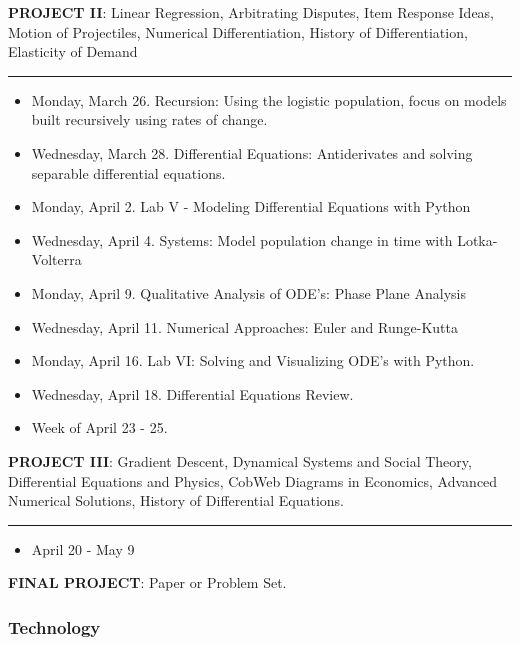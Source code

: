 \documentclass[11pt]{article}
\providecommand{\tightlist}{%
      \setlength{\itemsep}{0pt}\setlength{\parskip}{0pt}}
\begin{document}
\textbf{PROJECT II}: Linear Regression, Arbitrating Disputes, Item
Response Ideas, Motion of Projectiles, Numerical Differentiation,
History of Differentiation, Elasticity of Demand

\begin{center}\rule{0.5\linewidth}{\linethickness}\end{center}

\begin{itemize}
\item
  Monday, March 26. Recursion: Using the logistic population, focus on
  models built recursively using rates of change.
\item
  Wednesday, March 28. Differential Equations: Antiderivates and solving
  separable differential equations.
\item
  Monday, April 2. Lab V - Modeling Differential Equations with Python
\item
  Wednesday, April 4. Systems: Model population change in time with
  Lotka-Volterra
\item
  Monday, April 9. Qualitative Analysis of ODE's: Phase Plane Analysis
\item
  Wednesday, April 11. Numerical Approaches: Euler and Runge-Kutta
\item
  Monday, April 16. Lab VI: Solving and Visualizing ODE's with Python.
\item
  Wednesday, April 18. Differential Equations Review.
\item
  Week of April 23 - 25.
\end{itemize}

\textbf{PROJECT III}: Gradient Descent, Dynamical Systems and Social
Theory, Differential Equations and Physics, CobWeb Diagrams in
Economics, Advanced Numerical Solutions, History of Differential
Equations.

\begin{center}\rule{0.5\linewidth}{\linethickness}\end{center}

\begin{itemize}
\tightlist
\item
  April 20 - May 9
\end{itemize}

\textbf{FINAL PROJECT}: Paper or Problem Set.

    \subsubsection{Technology}\label{technology}
\end{document}
